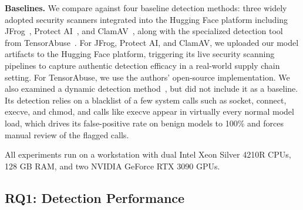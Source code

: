 \noindent \textbf{Baselines.}
We compare against four baseline detection methods: three widely adopted security scanners integrated into the Hugging Face platform including JFrog~\cite{jfrog2024huggingface}, Protect AI~\cite{modelscan}, and ClamAV~\cite{clamav}, along with the specialized detection tool from TensorAbuse~\cite{zhu2025}.
For JFrog, Protect AI, and ClamAV, we uploaded our model artifacts to the Hugging Face platform, triggering its live security scanning pipelines to capture authentic detection efficacy in a real-world supply chain setting. For TensorAbuse, we use the authors' open-source implementation. We also examined a dynamic detection method~\cite{casey2024largescaleexploitinstrumentationstudy}, but did not include it as a baseline. Its detection relies on a blacklist of a few system calls such as socket, connect, execve, and chmod, and calls like execve appear in virtually every normal model load, which drives its false-positive rate on benign models to 100\% and forces manual review of the flagged calls. 

All experiments run on a workstation with dual Intel Xeon Silver 4210R CPUs, 128 GB RAM, and two NVIDIA GeForce RTX 3090 GPUs.

\subsection{RQ1: Detection Performance}



\label{sec:rq1}

